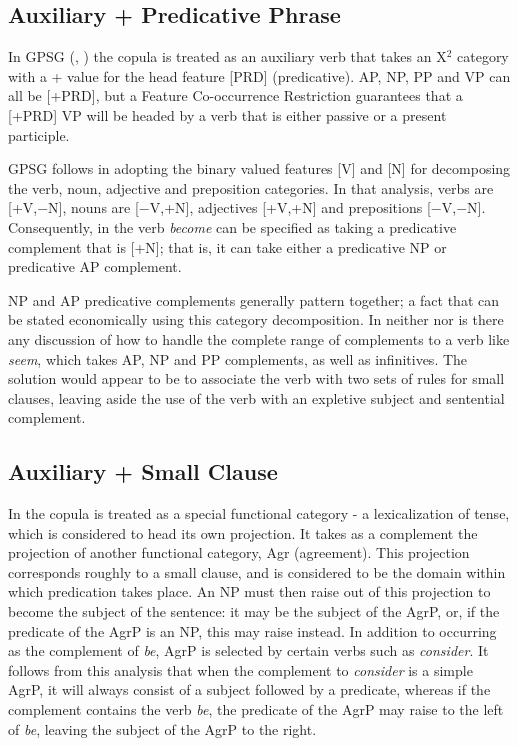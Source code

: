 \subsection{Auxiliary + Predicative Phrase}
\label{gpsg}

In GPSG (\cite{gazdar85}, \cite{sag85}) the copula is treated as an auxiliary
verb that takes an X$^{2}$ category with a + value for the head feature
[PRD] (predicative). AP, NP, PP and VP can all be [+PRD], but a
Feature Co-occurrence Restriction guarantees that a [+PRD] VP will be
headed by a verb that is either passive or a present participle.

GPSG follows \cite{chomsky70} in adopting the binary valued features [V] and
[N] for decomposing the verb, noun, adjective and preposition categories.  In
that analysis, verbs are [+V,$-$N], nouns are [$-$V,+N], adjectives
[+V,+N] and prepositions [$-$V,$-$N].  Consequently, in \cite{sag85} the
verb {\it become} can be specified as taking a predicative complement that is
[+N]; that is, it can take either a predicative NP or predicative AP
complement.


NP and AP predicative complements generally pattern together; a fact that can
be stated economically using this category decomposition.  In neither
\cite{sag85} nor \cite{chomsky70} is there any discussion of how to handle 
the complete range of complements to a verb like {\it seem}, which takes AP,
NP and PP complements, as well as infinitives.  The solution would appear
to be to associate the verb with two sets of rules for small clauses, leaving
aside the use of the verb with an expletive subject and sentential complement.

\subsection{Auxiliary + Small Clause}

\label{mo}
In \cite{moro90} the copula is treated as a special functional category - a
lexicalization of tense, which is considered to head its own projection. It
takes as a complement the projection of another functional category, Agr
(agreement). This projection corresponds roughly to a small clause, and is
considered to be the domain within which predication takes place.  An NP must
then raise out of this projection to become the subject of the sentence: it may
be the subject of the AgrP, or, if the predicate of the AgrP is an NP, this may
raise instead.  In addition to occurring as the complement of {\it be}, AgrP is
selected by certain verbs such as {\it consider}. It follows from this analysis
that when the complement to {\it consider} is a simple AgrP, it will always
consist of a subject followed by a predicate, whereas if the complement
contains the verb {\it be}, the predicate of the AgrP may raise to the left of
{\it be}, leaving the subject of the AgrP to the right.

